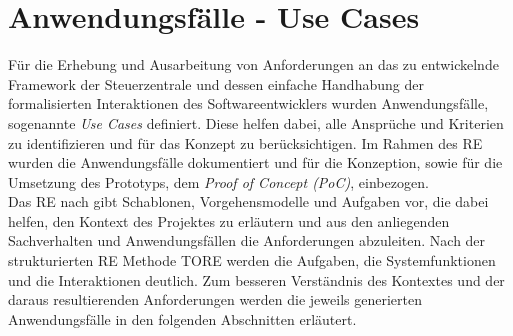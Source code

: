 \section{Anwendungsfälle - Use Cases}
\label{sec:usecases}
    Für die Erhebung und Ausarbeitung von Anforderungen an das zu entwickelnde Framework der Steuerzentrale und dessen 
    einfache Handhabung der formalisierten Interaktionen des Softwareentwicklers wurden Anwendungsfälle, sogenannte 
    \textit{Use Cases} definiert. Diese helfen dabei, alle Ansprüche und Kriterien zu identifizieren und für das 
    Konzept zu berücksichtigen. Im Rahmen des \acl{RE} wurden die Anwendungsfälle dokumentiert und für die Konzeption, sowie 
    für die Umsetzung des Prototyps, dem \textit{Proof of Concept (PoC)}, einbezogen. 
    \\ 
    Das \acs{RE} nach \cite{pohl2021basiswissen} gibt Schablonen, Vorgehensmodelle und Aufgaben 
    vor, die dabei helfen, den Kontext des Projektes zu erläutern und aus den anliegenden Sachverhalten und Anwendungsfällen 
    die Anforderungen abzuleiten. Nach der strukturierten \acs{RE} Methode \ac{TORE} \cite{tore2014} werden die 
    Aufgaben, die Systemfunktionen und die Interaktionen deutlich. Zum besseren Verständnis des Kontextes und der daraus 
    resultierenden Anforderungen werden die jeweils generierten Anwendungsfälle in den folgenden Abschnitten 
    erläutert.

